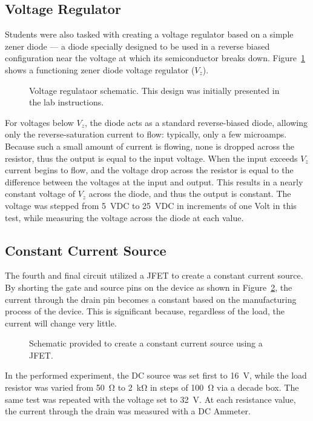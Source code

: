 \subsection{Voltage Regulator}
Students were also tasked with creating a voltage regulator based on a simple
zener diode --- a diode specially designed to be used in a reverse biased
configuration near the voltage at which its semiconductor breaks down.
Figure~\ref{fig:schem3} shows a functioning zener diode voltage regulator ($V_z$).
%
\begin{figure}[H]
	\centering
	
	\caption{Voltage regulataor schematic.  This design was initially presented in the lab instructions.}
	\label{fig:schem3}
\end{figure}
%
For voltages below $V_z$, the diode acts as a standard reverse-biased diode,
allowing only the reverse-saturation current to flow: typically, only a few
microamps.  Because such a small amount of current is flowing, none is dropped
across the resistor, thus the output is equal to the input voltage.  When the
input exceeds $V_z$ current begins to flow, and the voltage drop across the
resistor is equal to the difference between the voltages at the input and
output.  This results in a nearly constant voltage of $V_z$ across the diode,
and thus the output is constant.  The voltage was stepped from \SI{5}{\volt}DC
to \SI{25}{\volt}{DC} in increments of one Volt in this test, while measuring
the voltage across the diode at each value.

\subsection{Constant Current Source}
The fourth and final circuit utilized a JFET to create a constant current
source.  By shorting the gate and source pins on the device as shown in
Figure~\ref{fig:schem4}, the current through the drain pin becomes a constant
based on the manufacturing process of the device.  This is significant because,
regardless of the load, the current will change very little.
%
\begin{figure}[H]
	\centering
	
	\caption{Schematic provided to create a constant current source using a JFET.}
	\label{fig:schem4}
\end{figure}
%
In the performed experiment, the DC source was set first to \SI{16}{\volt},
while the load resistor was varied from \SI{50}{\ohm} to \SI{2}{\kilo\ohm} in
steps of \SI{100}{\ohm} via a decade box.  The same test was repeated with the
voltage set to \SI{32}{\volt}.  At each resistance value, the current through
the drain was measured with a DC Ammeter.
